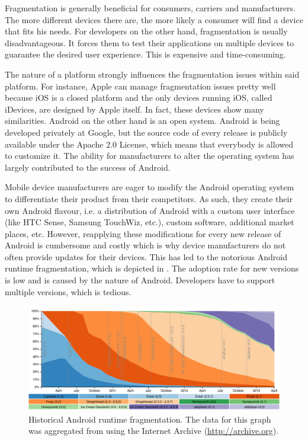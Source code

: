 Fragmentation is generally beneficial for consumers, carriers and manufacturers. The more different devices there are, the more likely a consumer will find a device that fits his needs. For developers on the other hand, fragmentation is usually disadvantageous. It forces them to test their applications on multiple devices to guarantee the desired user experience. This is expensive and time-consuming. 

The nature of a platform strongly influences the fragmentation issues within said platform. For instance, Apple can manage fragmentation issues pretty well because iOS is a closed platform and the only devices running iOS, called iDevices, are designed by Apple itself. In fact, these devices show many similarities. Android on the other hand is an open system. Android is being developed privately at Google, but the source code of every release is publicly available under the Apache 2.0 License, which means that everybody is allowed to customize it. The ability for manufacturers to alter the operating system has largely contributed to the success of Android. 

Mobile device manufacturers are eager to modify the Android operating system to differentiate their product from their competitors. As such, they create their own Android flavour, i.e. a distribution of Android with a custom user interface (like HTC Sense, Samsung TouchWiz, etc.), custom software, additional market places, etc. However, reapplying these modifications for every new release of Android is cumbersome and costly which is why device manufacturers do not often provide updates for their devices. This has led to the notorious Android runtime fragmentation, which is depicted in . The adoption rate for new versions is low and is caused by the nature of Android. Developers have to support multiple versions, which is tedious. 

\begin{figure}[h]
    \centering
    \includegraphics[width=\textwidth]{figs/android_runtimes.pdf}
    \caption{Historical Android runtime fragmentation. The data for this graph was aggregated from \cite{Android:Versions} using the Internet Archive (\url{http://archive.org}).}
    \label{fig:android_runtimes}
\end{figure}

